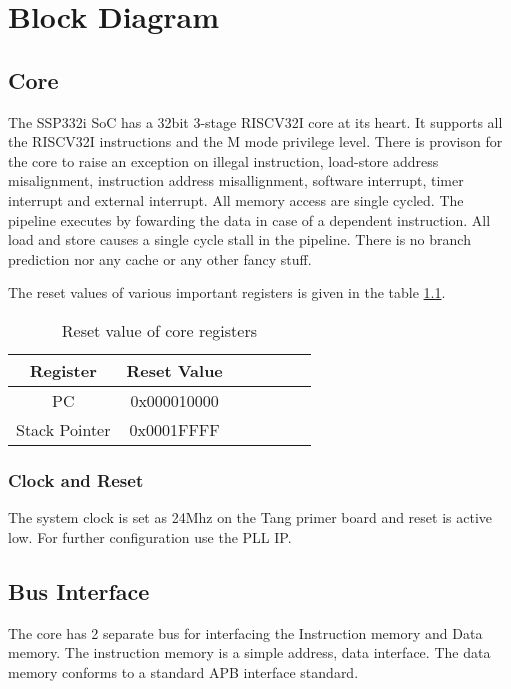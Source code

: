 \documentclass[12pt,a4paper]{report}
\begin{document}
\tableofcontents
\thispagestyle{logo}
\listoffigures
\thispagestyle{logo}
\listoftables
\thispagestyle{logo}

\pagestyle{logo}
\chapter{Block Diagram}
\thispagestyle{logo}
\section{Core}
The SSP332i SoC has a 32bit 3-stage RISCV32I core at its heart. It supports all the RISCV32I instructions and the M mode privilege level. There is provison for the core to raise an exception on illegal instruction, load-store address misalignment, instruction address misallignment, software interrupt, timer interrupt and external interrupt. All memory access are single cycled. The pipeline executes by fowarding the data in case of a dependent instruction. All load and store causes a single cycle stall in the pipeline. There is no  branch prediction nor any cache or any other fancy stuff.

The reset values of various important registers  is given in the table \ref{tab:reg}.
\begin{table} 
\begin{center}
\begin{tabular}{|c|c|c|c|c|c|c| } 
 \hline
Register  &  Reset Value  \\ 
\hline
PC &  0x000010000   \\
 \hline
Stack Pointer &  0x0001FFFF   \\
 \hline
\end{tabular}
\caption{\label{tab:reg} Reset value of core registers}
\end{center}
\end{table}



\subsection{Clock and Reset}
The system clock is set as 24Mhz on the Tang primer board and reset is active low. For further configuration use the PLL IP.


\section{Bus Interface}
The core has 2 separate bus for interfacing the Instruction memory and Data memory. The instruction memory is a simple address, data interface. The data memory conforms to a standard APB interface standard.
\end{document}
